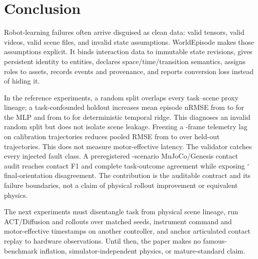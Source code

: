 \section{Conclusion}
\label{sec:conclusion}

Robot-learning failures often arrive disguised as clean data: valid tensors, valid videos, valid
scene files, and invalid state assumptions. WorldEpisode makes those
assumptions explicit. It binds interaction data to immutable state revisions, gives persistent
identity to entities, declares space/time/transition semantics, assigns roles to assets, records
events and provenance, and reports conversion loss instead of hiding it.

In the reference experiments, a random split overlaps every task--scene proxy lineage; a
task-confounded holdout increases mean episode nRMSE from \ExpMlpRandomNrmse{} to
\ExpMlpHeldoutNrmse{} for the MLP and from \ExpTemporalRandomNrmse{} to
\ExpTemporalHeldoutNrmse{} for deterministic temporal ridge. This diagnoses an invalid random split
but does not isolate scene leakage. Freezing a \ExpTimingDelayFrames-frame telemetry lag on
\ExpTimingCalibrationEpisodes{} calibration trajectories reduces pooled RMSE from
\ExpTimingZeroRmse{} to \ExpTimingFrozenRmse{} over \ExpTimingHeldoutEpisodes{} held-out
trajectories. This does not measure motor-effective latency. The validator catches every injected
fault class. A preregistered \ExpContactReplayScenarioCount-scenario MuJoCo/Genesis contact audit
reaches \ExpContactReplayFOne{} contact F1 and complete task-outcome agreement while exposing
\ExpContactReplayFinalOrientationDeg$^\circ$ final-orientation disagreement. The contribution is
the auditable contract and its failure boundaries, not a claim of physical rollout improvement or
equivalent physics.

The next experiments must disentangle task from physical scene lineage, run ACT/Diffusion and
rollouts over matched seeds, instrument command and motor-effective timestamps on another controller,
and anchor articulated contact replay to hardware observations. Until then, the paper makes no
famous-benchmark inflation, simulator-independent physics, or mature-standard claim.
